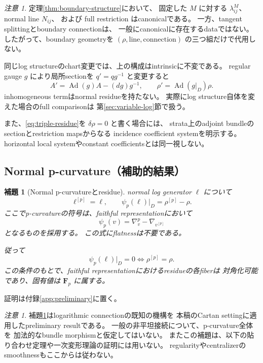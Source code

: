 \documentclass[uplatex,dvipdfmx,11pt]{jsarticle}
\numberwithin{equation}{section}
\theoremstyle{plain}
\newtheorem{lemma}[theorem]{補題}
\theoremstyle{definition}
\theoremstyle{remark}
\newtheorem{remark}[theorem]{注意}
\DeclareMathOperator{\Ad}{Ad}
\newcommand{\FF}{\mathbf F}
\begin{document}
\begin{remark}
\label{rem:boundary-invariance}
定理\ref{thm:boundary-structure}において、
固定した \(M\) に対する \(\lambda^M_{ij}\)、normal line \(N_{ij}\)、
および full restriction はcanonicalである。
一方、tangent splittingとboundary connectionは、
一般にcanonicalに存在するdataではない。
したがって、boundary geometryを
\((\rho,\text{line},\text{connection})\) の三つ組だけで代用しない。

同じlog structureのchart変更では、上の構成はintrinsicに不変である。
regular gauge \(g\) により局所sectionを \(q'=qg^{-1}\) と変更すると
\[
A'=\Ad(g)A-(dg)g^{-1},\qquad
\rho'=\Ad(g|_D)\rho.
\]
inhomogeneous termはnormal residueを持たない。
実際にlog structure自体を変えた場合のfull comparisonは
第\ref{sec:variable-log}節で扱う。

また、\eqref{eq:triple-residue}を
\(\delta\rho=0\) と書く場合には、
strata上のadjoint bundleのsectionとrestriction mapsからなる
incidence coefficient systemを明示する。
horizontal local systemやconstant coefficientsとは同一視しない。
\end{remark}

\subsection{Normal p-curvature（補助的結果）}

\begin{lemma}[Normal p-curvatureとresidue]
\label{lem:p-curvature}
normal log generator \(\ell\) について
\[
\ell^{[p]}=\ell,\qquad
\psi_p(\ell)|_D=\rho^{[p]}-\rho.
\]
ここでp-curvatureの符号は、faithful representationにおいて
\[
\psi_p(v)=\nabla_v^p-\nabla_{v^{[p]}}
\]
となるものを採用する。
この式にflatnessは不要である。

従って
\[
\psi_p(\ell)|_D=0\iff\rho^{[p]}=\rho.
\]
この条件のもとで、faithful representationにおけるresidueの各fiberは
対角化可能であり、固有値は \(\FF_p\) に属する。
\end{lemma}

証明は付録\ref{app:preliminary}に置く。

\begin{remark}
\label{rem:p-curvature-scope}
補題\ref{lem:p-curvature}はlogarithmic connectionの既知の機構を
本稿のCartan settingに適用したpreliminary resultである。
一般の非平坦接続について、p-curvature全体を
加法的なbundle morphismと仮定してはいない。
またこの補題は、以下の貼り合わせ定理や一次変形理論の証明には用いない。
regularityやcentralizerのsmoothnessもここからは従わない。
\end{remark}
\end{document}
